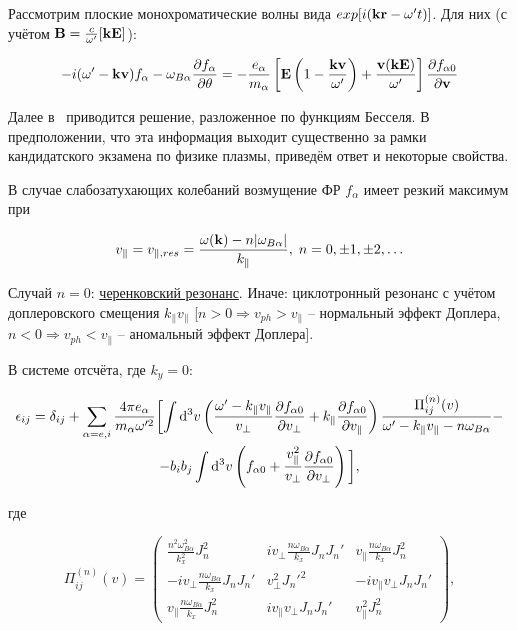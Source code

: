 \documentclass[10pt, a4paper]{article}
\begin{document}
Рассмотрим плоские монохроматические волны вида $exp[i(\vb{k}\vb{r}-\omega't)]$. Для них (с учётом $\vb{B}=\frac{c}{\omega'}[\vb{k}\vb{E}]$):

\begin{equation*}
	-i(\omega'-\vb{k}\vb{v})f_\alpha-\omega_{B\alpha}\pdv{f_\alpha}{\theta}=-\frac{e_\alpha}{m_\alpha}\left[\vb{E}\left(1-\frac{\vb{k}\vb{v}}{\omega'}\right)+\frac{\vb{v}(\vb{k}\vb{E})}{\omega'}\right]\pdv{f_{\alpha 0}}{\vb{v}} 
\end{equation*}

Далее в~\cite{akhiezer} приводится решение, разложенное по функциям Бесселя. В предположении, что эта информация выходит существенно за рамки кандидатского экзамена по физике плазмы, приведём ответ и некоторые свойства.

В случае слабозатухающих колебаний возмущение ФР $f_\alpha$ имеет резкий максимум при

\begin{equation*}
	v_\parallel = v_{\parallel,res}=\frac{\omega(\vb{k})-n\abs{\omega_{B\alpha}}}{k_\parallel},\;n=0,\pm1,\pm2,\ldots
\end{equation*}

Случай $n=0$: \uline{черенковский резонанс}. Иначе: циклотронный резонанс с учётом доплеровского смещения $k_\parallel v_\parallel$ [$n>0\Rightarrow v_{ph}>v_\parallel$ -- нормальный эффект Доплера, $n<0\Rightarrow v_{ph}<v_\parallel$ -- аномальный эффект Доплера].

В системе отсчёта, где $k_y=0$:

\begin{multline*}
	\epsilon_{ij} = \delta_{ij}+\sum\limits_{\alpha=e,i}\frac{4\pi e_\alpha}{m_\alpha\omega'^2}\biggl[\int\dd[3]{v}\left(\frac{\omega'-k_\parallel v_\parallel}{v_\perp}\pdv{f_{\alpha 0}}{v_\perp}+k_\parallel\pdv{f_{\alpha 0 }}{v_\parallel} \right)\frac{\Pi_{ij}^{(n)}(v)}{\omega'-k_\parallel v_\parallel -n\omega_{B\alpha}}- \\
	-b_ib_j\int\dd[3]{v}\left(f_{\alpha 0}+\frac{v_\parallel^2}{v_\perp}\pdv{f_{\alpha 0}}{v_\perp}\right)\biggl],
\end{multline*}

где

\begin{equation*}
	\Pi_{ij}^{(n)}(v) =
	\begin{pmatrix}
		\frac{n^2\omega_{B\alpha}^2}{k_x^2}J_n^2 & iv_\perp\frac{n\omega_{B\alpha}}{k_x}J_nJ_n' & v_\parallel\frac{n\omega_{B\alpha}}{k_x}J_n^2 \\
		-iv_\perp\frac{n\omega_{B\alpha}}{k_x}J_nJ_n' & v_\perp^2J_n'^2 & -iv_\parallel v_\perp J_nJ_n' \\
		v_\parallel\frac{n\omega_{B\alpha}}{k_x}J_n^2 & iv_\parallel v_\perp J_nJ_n' & v_\parallel^2J_n^2
	\end{pmatrix},
\end{equation*}
\end{document}
